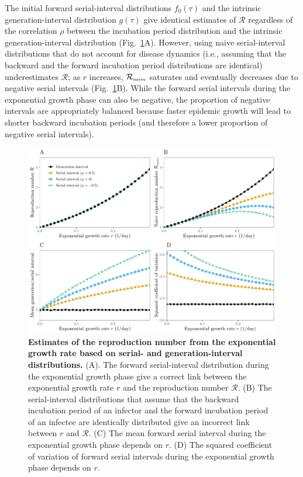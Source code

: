 \documentclass[12pt]{article}
\newcommand{\fref}[1]{Fig.~\ref{fig:#1}}
\newcommand{\RR}{\ensuremath{{\mathcal R}}\xspace}
\newcommand{\Rnaive}{\ensuremath{{\mathcal R}_{\textrm{\tiny naive}}}\xspace}
\begin{document}
The initial forward serial-interval distributions $f_0(\tau)$ and the intrinsic generation-interval distribution $g(\tau)$ give identical estimates of \RR regardless of the correlation $\rho$ between the incubation period distribution and the intrinsic generation-interval distribution (\fref{rR}A).
However, using naive serial-interval distributions that do not account for disease dynamics (i.e., assuming that the backward and the forward incubation period distributions are identical) underestimates \RR;
as $r$ increases, \Rnaive saturates and eventually decreases due to negative serial intervals (\fref{rR}B).
While the forward serial intervals during the exponential growth phase can also be negative, the proportion of negative intervals are appropriately balanced because faster epidemic growth will lead to shorter backward incubation periods (and therefore a lower proportion of negative serial intervals).

\begin{figure}[!th]
\includegraphics[width=\textwidth]{rR.pdf}
\caption{
\textbf{Estimates of the reproduction number from the exponential growth rate based on serial- and generation-interval distributions.}
(A). The forward serial-interval distribution during the exponential growth phase give a correct link between the exponential growth rate $r$ and the reproduction number \RR.
(B) The serial-interval distributions that assume that the backward incubation period of an infector and the forward incubation period of an infectee are identically distributed give an incorrect link between $r$ and \RR.
(C) The mean forward serial interval during the exponential growth phase depends on $r$.
(D) The squared coefficient of variation of forward serial intervals during the exponential growth phase depends on $r$.
}
\label{fig:rR}
\end{figure}
\end{document}
